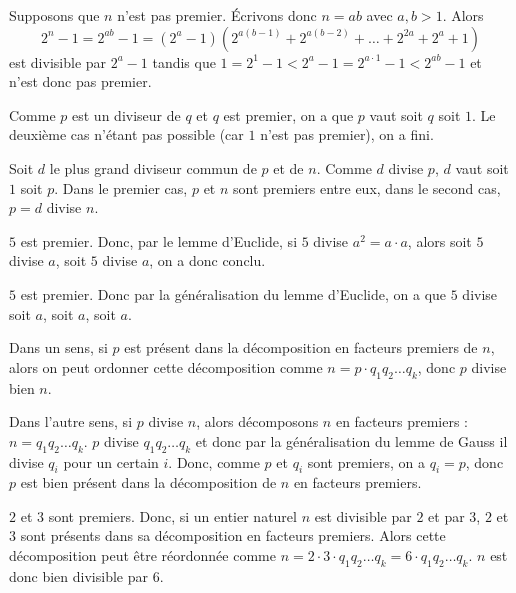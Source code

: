 \begin{sol}
Supposons que $n$ n'est pas premier. Écrivons donc $n = ab$ avec $a, b > 1$. Alors
$$2^n - 1 = 2^{ab} - 1 = (2^a - 1)(2^{a(b - 1)} + 2^{a(b - 2)} + \dots + 2^{2a} + 2^a + 1)$$
est divisible par $2^a - 1$ tandis que $1 = 2^1 - 1 < 2^a - 1 = 2^{a\cdot 1} - 1 < 2^{ab} - 1$ et n'est donc pas premier.
\end{sol}


\begin{sol}
Comme $p$ est un diviseur de $q$ et $q$ est premier, on a que $p$ vaut soit $q$ soit $1$. Le deuxième cas n'étant pas possible (car $1$ n'est pas premier), on a fini.
\end{sol}


\begin{sol}
Soit $d$ le plus grand diviseur commun de $p$ et de $n$. Comme $d$ divise $p$, $d$ vaut soit $1$ soit $p$. Dans le premier cas, $p$ et $n$ sont premiers entre eux, dans le second cas, $p = d$ divise $n$.
\end{sol}


\begin{sol}
$5$ est premier. Donc, par le lemme d'Euclide, si $5$ divise $a^2 = a \cdot a$, alors soit $5$ divise $a$, soit $5$ divise $a$, on a donc conclu.
\end{sol}


\begin{sol}
$5$ est premier. Donc par la généralisation du lemme d'Euclide, on a que $5$ divise soit $a$, soit $a$, soit $a$.
\end{sol}


\begin{sol}
Dans un sens, si $p$ est présent dans la décomposition en facteurs premiers de $n$, alors on peut ordonner cette décomposition comme $n = p \cdot q_1 q_2 \dots q_k$, donc $p$ divise bien $n$.

Dans l'autre sens, si $p$ divise $n$, alors décomposons $n$ en facteurs premiers : $n = q_1 q_2 \dots q_k$. $p$ divise $q_1 q_2 \dots q_k$ et donc par la généralisation du lemme de Gauss il divise $q_i$ pour un certain $i$. Donc, comme $p$ et $q_i$ sont premiers, on a $q_i = p$, donc $p$ est bien présent dans la décomposition de $n$ en facteurs premiers.
\end{sol}


\begin{sol}
$2$ et $3$ sont premiers. Donc, si un entier naturel $n$ est divisible par $2$ et par $3$, $2$ et $3$ sont présents dans sa décomposition en facteurs premiers. Alors cette décomposition peut être réordonnée comme $n = 2 \cdot 3 \cdot q_1 q_2 \dots q_k = 6 \cdot q_1 q_2 \dots q_k$. $n$ est donc bien divisible par $6$.
\end{sol}


